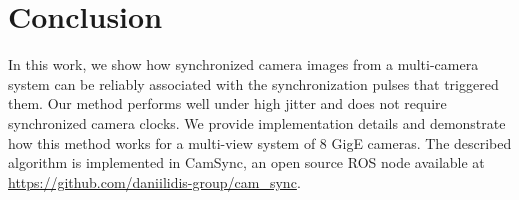 \section{Conclusion}
In this work, we show how synchronized camera images from a
multi-camera system can be reliably associated
with the synchronization pulses that triggered them. Our method
performs well under high jitter and does not require synchronized camera clocks. We
provide implementation details and demonstrate how this method works
for a multi-view system of 8 GigE cameras. The described algorithm is
implemented in CamSync, an open source ROS node available at 
\href{https://github.com/daniilidis-group/cam_sync}{https://github.com/daniilidis-group/cam\_sync}.

